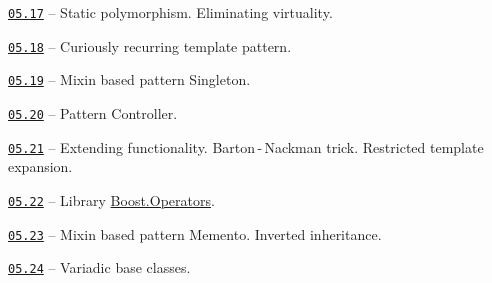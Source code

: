 \documentclass[a4paper,12pt]{article}
\renewenvironment{itemize}
{
    \begin{list}{\labelitemi}
    {
      \setlength{\topsep}{0pt}
      \setlength{\partopsep}{0pt}
      \setlength{\parskip}{0pt}
      \setlength{\itemsep}{0pt}
      \setlength{\parsep}{0pt}
      \setlength{\leftmargin}{14.5pt}
    }
}{\end{list}}
\begin{document}
\begin{itemize}

    \item \href{https://github.com/i-s-m-mipt/Education/blob/master/projects/examples/source/05.17.cpp}{\texttt{05.17}} -- Static polymorphism. Eliminating virtuality.

    \smallskip

    \item \href{https://github.com/i-s-m-mipt/Education/blob/master/projects/examples/source/05.18.cpp}{\texttt{05.18}} -- Curiously recurring template pattern.

    \smallskip

    \item \href{https://github.com/i-s-m-mipt/Education/blob/master/projects/examples/source/05.19.cpp}{\texttt{05.19}} -- Mixin based pattern Singleton.

    \smallskip

    \item \href{https://github.com/i-s-m-mipt/Education/blob/master/projects/examples/source/05.20.cpp}{\texttt{05.20}} -- Pattern Controller.

    \smallskip

    \item \href{https://github.com/i-s-m-mipt/Education/blob/master/projects/examples/source/05.21.cpp}{\texttt{05.21}} -- Extending functionality. Barton\,-\,Nackman trick. Restricted template expansion.

    \smallskip

    \item \href{https://github.com/i-s-m-mipt/Education/blob/master/projects/examples/source/05.22.cpp}{\texttt{05.22}} -- Library \href{https://www.boost.org/doc/libs/1_84_0/libs/utility/doc/html/utility/utilities/operators.html}{Boost.Operators}.

    \smallskip

    \item \href{https://github.com/i-s-m-mipt/Education/blob/master/projects/examples/source/05.23.cpp}{\texttt{05.23}} -- Mixin based pattern Memento. Inverted inheritance.

    \smallskip

    \item \href{https://github.com/i-s-m-mipt/Education/blob/master/projects/examples/source/05.24.cpp}{\texttt{05.24}} -- Variadic base classes.

\end{itemize}
\end{document}
